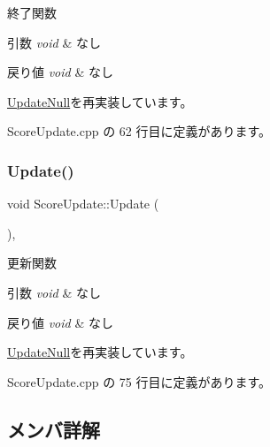 終了関数 


\begin{DoxyParams}{引数}
{\em void} & なし \\
\hline
\end{DoxyParams}

\begin{DoxyRetVals}{戻り値}
{\em void} & なし \\
\hline
\end{DoxyRetVals}


\mbox{\hyperlink{class_update_null_a820189d686ec62f7a30d547118c419df}{Update\+Null}}を再実装しています。



 Score\+Update.\+cpp の 62 行目に定義があります。

\mbox{\label{class_score_update_aae2b398784079a651ed92eb4c634b1c9}} 
\subsubsection{\texorpdfstring{Update()}{Update()}}
{\footnotesize\ttfamily void Score\+Update\+::\+Update (\begin{DoxyParamCaption}{ }\end{DoxyParamCaption})\hspace{0.3cm}{\ttfamily [override]}, {\ttfamily [virtual]}}



更新関数 


\begin{DoxyParams}{引数}
{\em void} & なし \\
\hline
\end{DoxyParams}

\begin{DoxyRetVals}{戻り値}
{\em void} & なし \\
\hline
\end{DoxyRetVals}


\mbox{\hyperlink{class_update_null_ab3f9cabc6ddcb4ef8743f212c26be144}{Update\+Null}}を再実装しています。



 Score\+Update.\+cpp の 75 行目に定義があります。



\subsection{メンバ詳解}
\mbox{\label{class_score_update_ab78fc9ad68faf9f5be01096b5d60959e}} 
